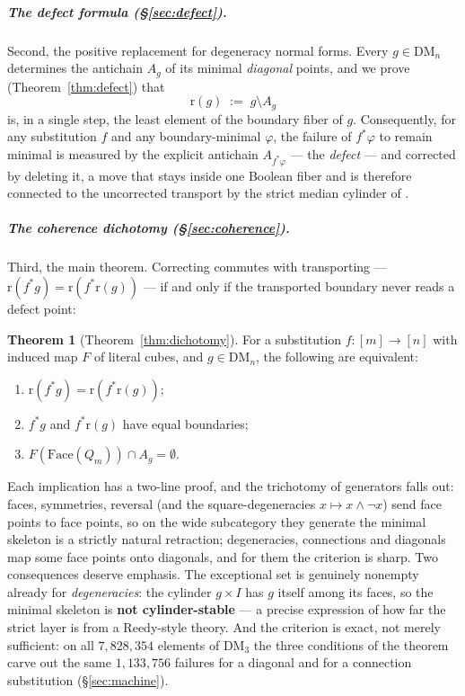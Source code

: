 \documentclass[11pt]{amsart}
\theoremstyle{definition}
\newtheorem*{thmstar}{Theorem}
\newcommand{\DM}{\mathrm{DM}}
\newcommand{\lc}{Q}
\newcommand{\Face}{\mathrm{Face}}
\newcommand{\rmin}{\mathrm{r}}
\begin{document}
\subparagraph*{The defect formula (\S\ref{sec:defect}).}  Second,
the positive replacement for degeneracy normal forms.  Every
$g \in \DM_n$ determines the antichain $A_g$ of its minimal
\emph{diagonal} points, and we prove
(Theorem~\ref{thm:defect}) that
\[
  \rmin(g) \;:=\; g \setminus A_g
\]
is, in a single step, the least element of the boundary fiber of
$g$.  Consequently, for any substitution $f$ and any
boundary-minimal $\varphi$, the failure of $f^{*}\varphi$ to remain
minimal is measured by the explicit antichain $A_{f^{*}\varphi}$ ---
the \emph{defect} --- and corrected by deleting it, a move that
stays inside one Boolean fiber and is therefore connected to the
uncorrected transport by the strict median cylinder of
\cite{DMFibers}.

\subparagraph*{The coherence dichotomy (\S\ref{sec:coherence}).}
Third, the main theorem.  Correcting commutes with transporting ---
$\rmin(f^{*}g) = \rmin(f^{*}\rmin(g))$ --- if and only if the
transported boundary never reads a defect point:

\begin{thmstar}[Theorem~\ref{thm:dichotomy}]
  For a substitution $f : [m] \to [n]$ with induced map $F$ of
  literal cubes, and $g \in \DM_n$, the following are equivalent:
  \begin{enumerate}
  \item $\rmin(f^{*}g) = \rmin(f^{*}\rmin(g))$;
  \item $f^{*}g$ and $f^{*}\rmin(g)$ have equal boundaries;
  \item $F(\Face(\lc_m)) \cap A_g = \emptyset$.
  \end{enumerate}
\end{thmstar}

Each implication has a two-line proof, and the trichotomy of
generators falls out: faces, symmetries, reversal (and the
square-degeneracies $x \mapsto x \wedge \neg x$) send face points to
face points, so on the wide subcategory they generate the minimal
skeleton is a strictly natural retraction; degeneracies, connections
and diagonals map some face points onto diagonals, and for them the
criterion is sharp.  Two consequences deserve emphasis.  The
exceptional set is genuinely nonempty already for
\emph{degeneracies}: the cylinder $g \times I$ has $g$ itself among
its faces, so the minimal skeleton is \textbf{not cylinder-stable}
--- a precise expression of how far the strict layer is from a
Reedy-style theory.  And the criterion is exact, not merely
sufficient: on all $7{,}828{,}354$ elements of $\DM_3$ the three
conditions of the theorem carve out the same $1{,}133{,}756$
failures for a diagonal and for a connection substitution
(\S\ref{sec:machine}).
\end{document}

